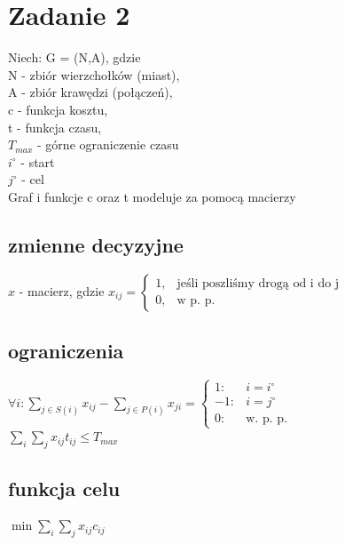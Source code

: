 \documentclass{report}
\begin{document}
\section*{Zadanie 2}
Niech:
G = (N,A), gdzie\\
N - zbiór wierzchołków (miast),\\
A - zbiór krawędzi (połączeń),\\
c - funkcja kosztu,\\
t - funkcja czasu,\\
\(T_{max}\) - górne ograniczenie czasu \\
$i^\circ$ - start\\
$j^\circ$ - cel\\
Graf i funkcje c oraz t modeluje za pomocą macierzy\\
\subsection*{zmienne decyzyjne}
\(x\) - macierz, gdzie
$x_{ij} = \begin{cases} 1, & \text{jeśli poszliśmy drogą od i do j} \\ 0, & \text{w p. p.} \end{cases}$\\
\subsection*{ograniczenia}
$\forall i : \sum_{j\in S(i)}x_{ij} - \sum_{j\in P(i)}x_{ji} = \begin{cases} 1 : & i = i^\circ \\ -1 : & i = j^\circ \\ 0 : & \text{w. p. p.} \end{cases}$\\
$\sum_{i}\sum_{j}x_{ij}t_{ij}\leq T_{max}$
\subsection*{funkcja celu}
$\min\sum_{i}\sum_{j}x_{ij}c_{ij}$
\end{document}
